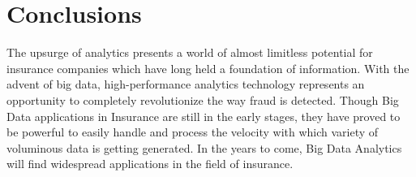 \documentclass[sigconf]{acmart}
\begin{document}
\section{Conclusions}
The upsurge of analytics presents a world of almost limitless potential for insurance companies which have long held a foundation of information.  With the advent of big data, high-performance analytics technology represents an opportunity to completely revolutionize the way fraud is detected. Though Big Data applications in Insurance are still in the early stages, they have proved to be powerful to easily handle and process the velocity with which variety of voluminous data is getting generated. In the years to come, Big Data Analytics will find widespread applications in the field of insurance.



 


\end{document}
